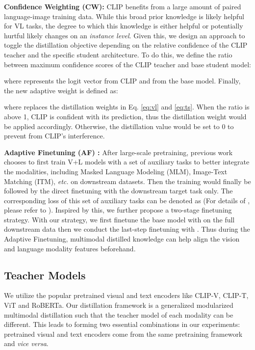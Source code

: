 \documentclass[runningheads]{llncs}
\begin{document}
{\bf \noindent Confidence Weighting (CW):} CLIP \cite{clip} benefits from a large amount of paired language-image training data. While this broad prior knowledge is likely helpful for VL tasks, the degree to which this knowledge is either helpful or potentially hurtful likely changes on an {\em instance level}. Given this, we design an approach to toggle the distillation objective depending on the relative confidence of the CLIP teacher and the specific student architecture. To do this, we define the ratio  between maximum confidence scores of the CLIP teacher and base student model:



\noindent where  represents the logit vector from CLIP and  from the base model. Finally, the new adaptive weight  is defined as:



\noindent where  replaces the distillation weights in Eq. \ref{eq:vl} and \ref{eq:ts}. When the ratio is above 1, CLIP is confident with its prediction, thus the distillation weight  would be applied accordingly. Otherwise, the distillation value would be set to 0 to prevent from CLIP's interference.

{\bf \noindent Adaptive Finetuning (AF) : } After large-scale pretraining, previous work \cite{chen2020uniter} chooses to first train V+L models with a set of auxiliary tasks to better integrate the modalities, including Masked Language Modeling (MLM), Image-Text Matching (ITM), \textit{etc.} on downstream datasets. Then the training would finally be followed by the direct finetuning with the downstream target task only. The corresponding loss of this set of auxiliary tasks can be denoted as   (For details of , please refer to \cite{chen2020uniter}). Inspired by this, we further propose a two-stage finetuning strategy. With our strategy, we first finetune the base model with  on the full downstream data then we conduct the last-step finetuning with . Thus during the Adaptive Finetuning, multimodal distilled knowledge can help align the vision and language modality features beforehand.




\subsection{Teacher Models}
We utilize the popular pretrained visual and text encoders like CLIP-V, CLIP-T, ViT and RoBERTa. Our distillation framework is a generalized modularized multimodal distillation such that the teacher model of each modality can be different. This leads to forming two essential combinations in our experiments: pretrained visual and text encoders come from the same pretraining framework and \textit{vice versa}.
\end{document}
